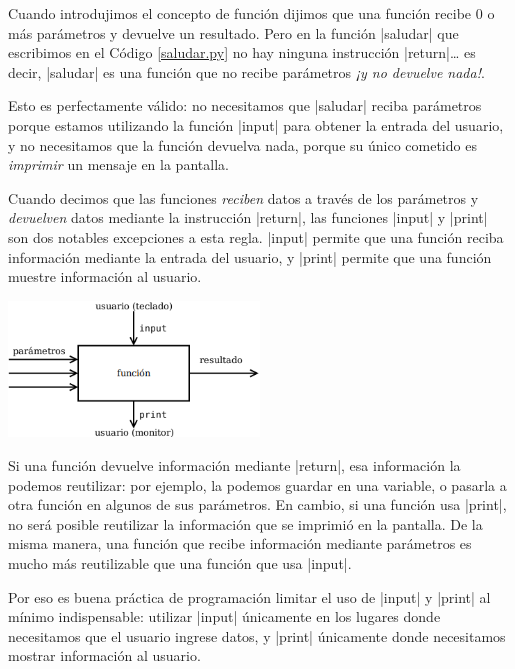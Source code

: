 \begin{atencion}
Cuando introdujimos el concepto de función dijimos que una función recibe 0 o
más parámetros y devuelve un resultado. Pero en la función |saludar| que
escribimos en el Código \ref{saludar.py} no hay ninguna instrucción
|return|\ldots
es decir, |saludar| es una función que no recibe parámetros {\it ¡y no devuelve
nada!}.

Esto es perfectamente válido: no necesitamos que |saludar| reciba parámetros
porque estamos utilizando la función |input| para obtener la entrada del
usuario, y no necesitamos que la función devuelva nada, porque su único
cometido es {\it imprimir} un mensaje en la pantalla.

Cuando decimos que las funciones {\it reciben} datos a través de los parámetros
y {\it devuelven} datos mediante la instrucción |return|, las funciones |input|
y |print| son dos notables excepciones a esta regla. |input| permite que una
función reciba información mediante la entrada del usuario, y |print| permite
que una función muestre información al usuario.

\begin{center}
\includegraphics[width=0.5\textwidth]{graficos/funcion_input_print}
\end{center}

Si una función devuelve información mediante |return|, esa información la
podemos reutilizar: por ejemplo, la podemos guardar en una variable, o pasarla
a otra función en algunos de sus parámetros. En cambio, si una función
usa |print|, no será posible reutilizar la información que se imprimió en la
pantalla. De la misma manera, una función que recibe información mediante
parámetros es mucho más reutilizable que una función que usa |input|.

Por eso es buena práctica de programación limitar el uso de |input| y |print|
al mínimo indispensable: utilizar |input| únicamente en los lugares donde
necesitamos que el usuario ingrese datos, y |print| únicamente donde
necesitamos mostrar información al usuario.
\end{atencion}

%
%
\clearpage

